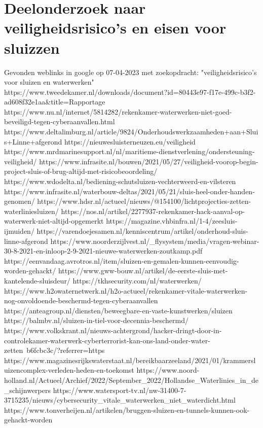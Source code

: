 \chapter{Deelonderzoek naar veiligheidsrisico's en eisen voor sluizzen}

Gevonden weblinks in google op 07-04-2023 met zoekopdracht: "veiligheidsrisico's voor sluizen en waterwerken"
https://www.tweedekamer.nl/downloads/document?id=80443e97-f17e-499c-b3f2-ad608f32e1aa&title=Rapportage%
https://www.nu.nl/internet/5814282/rekenkamer-waterwerken-niet-goed-beveiligd-tegen-cyberaanvallen.html
https://www.deltalimburg.nl/article/9824/Onderhoudswerkzaamheden+aan+Sluis+Linne+afgerond
https://nieuwesluisterneuzen.eu/veiligheid
https://www.mrdmarinesupport.nl/nl/maritieme-dienstverlening/ondersteuning-veiligheid/
https://www.infrasite.nl/bouwen/2021/05/27/veiligheid-voorop-begin-project-sluis-of-brug-altijd-met-risicobeoordeling/
https://www.wdodelta.nl/bediening-schutsluizen-vechterweerd-en-vilsteren
https://www.infrasite.nl/waterbouw-deltas/2021/05/21/sluis-heel-onder-handen-genomen/
https://www.hdsr.nl/actueel/nieuws/@154100/lichtprojecties-zetten-waterliniesluizen/
https://nos.nl/artikel/2277937-rekenkamer-hack-aanval-op-waterwerk-niet-altijd-opgemerkt
https://magazine.vhbinfra.nl/1-4/zeesluis-ijmuiden/
https://varendoejesamen.nl/kenniscentrum/artikel/onderhoud-sluis-linne-afgerond
https://www.noorderzijlvest.nl/_flysystem/media/vragen-webinar-30-8-2021-en-inloop-2-9-2021-nieuwe-waterwerken-zoutkamp.pdf
https://eenvandaag.avrotros.nl/item/sluizen-en-gemalen-kunnen-eenvoudig-worden-gehackt/
https://www.gww-bouw.nl/artikel/de-eerste-sluis-met-kantelende-sluisdeur/
https://tkhsecurity.com/nl/waterwerken/
https://www.h2owaternetwerk.nl/h2o-actueel/rekenkamer-vitale-waterwerken-nog-onvoldoende-beschermd-tegen-cyberaanvallen
https://anteagroup.nl/diensten/beweegbare-en-vaste-kunstwerken/sluizen
https://balmbv.nl/sluizen-in-tiel-voor-decennia-beschermd/
https://www.volkskrant.nl/nieuws-achtergrond/hacker-dringt-door-in-controlekamer-waterwerk-cyberterrorist-kan-ons-land-onder-water-zetten~b6fcbc3c/?referrer=https%
https://www.magazinesrijkswaterstaat.nl/bereikbaarzeeland/2021/01/krammersluizencomplex-verleden-heden-en-toekomst
https://www.noord-holland.nl/Actueel/Archief/2022/September_2022/Hollandse_Waterlinies_in_de_schijnwerpers
https://www.watersport-tv.nl/nw-31400-7-3715235/nieuws/cybersecurity_vitale_waterwerken_niet_waterdicht.html
https://www.tonverheijen.nl/artikelen/bruggen-sluizen-en-tunnels-kunnen-ook-gehackt-worden
